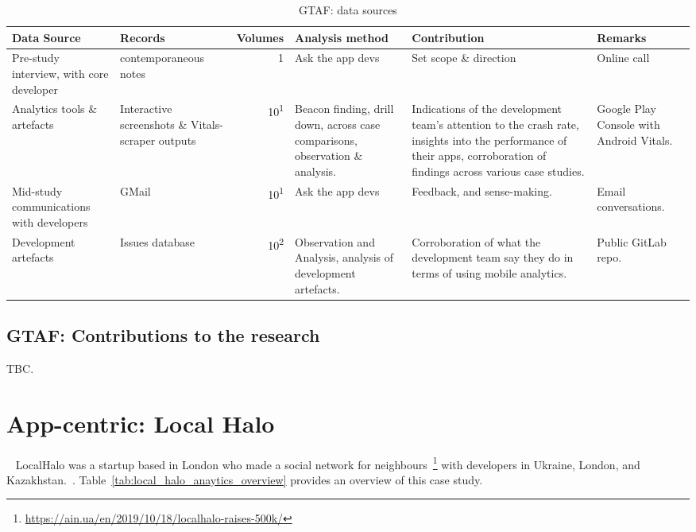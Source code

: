 \begin{table*}
    \centering
    \footnotesize
    \tabcolsep=0.12cm
    \begin{tabular}{p{2.4cm}p{2.4cm}r>{\raggedright}p{2.4cm}>{\raggedright}p{3cm}>{\raggedright\arraybackslash}p{2.5cm}}
        Data Source & Records & Volumes & Analysis method &Contribution & Remarks \\
        \toprule
         Pre-study interview, with core developer & contemporaneous notes\footnotemark & 1 & Ask the app devs & Set scope \& direction & Online call \\
         Analytics tools \& artefacts &Interactive screenshots \& Vitals-scraper outputs &10\textsuperscript{1} & Beacon finding, drill down, across case comparisons, observation \& analysis. & Indications of the development team's attention to the crash rate, insights into the performance of their apps, corroboration of findings across various case studies. & Google Play Console with Android Vitals. \\         
         Mid-study communications with developers & GMail & 10\textsuperscript{1} & Ask the app devs & Feedback, and sense-making.  & Email conversations. \\
         Development artefacts  & Issues database & 10\textsuperscript{2} & Observation and Analysis, analysis of development artefacts. & Corroboration of what the development team say they do in terms of using mobile analytics. & Public GitLab repo. \\
         \bottomrule
    \end{tabular}
    \caption{GTAF: data sources}
    \label{tab:gtaf-data-sources}
\end{table*}


\subsection{GTAF: Contributions to the research}
TBC.




\section{App-centric: Local Halo}~\label{case-study-overview-localhalo}
LocalHalo was a startup based in London who made a social network for neighbours~\footnote{\url{https://ain.ua/en/2019/10/18/localhalo-raises-500k/}} with developers in Ukraine, London, and Kazakhstan.~. 
Table~\ref{tab:local_halo_anaytics_overview} provides an overview of this case study.

